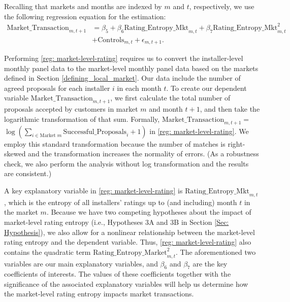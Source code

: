 \documentclass[msom,blindrev]{informs3}
\begin{document}
Recalling that markets and months are indexed by $m$ and $t$, respectively, we use the following regression equation for the estimation:
\begin{align} \nonumber
   \text{Market\_Transaction}_{m,t+1} & =\beta_{5} + \beta_{6} \text{Rating\_Entropy\_Mkt}_{m,t}+ \beta_{7} \text{Rating\_Entropy\_Mkt}_{m,t}^2\\ \label{reg: market-level-rating}
   &+ \text{Controls}_{m,t}  +\epsilon_{m,t+1}.
\end{align}

Performing \eqref{reg: market-level-rating} requires us to convert the installer-level monthly panel data to the market-level monthly panel data based on the markets defined in Section \ref{defining_local_market}. Our data include the number of agreed proposals for each installer $i$ in each month $t$. To create our dependent variable $\text{Market\_Transaction}_{m,t+1}$, we first calculate the total number of proposals accepted by customers in market $m$ and month $t+1$, and then take the logarithmic transformation of that sum. Formally, $\text{Market\_Transaction}_{m,t+1} =$ $\log\left( \sum_{i \in \text{Market\ } m} \text{Successful\_Proposals}_{i}+ 1 \right)$ in \eqref{reg: market-level-rating}.  We employ this standard transformation because the number of matches is right-skewed and the transformation increases the normality of errors. (As a robustness check, we also perform the analysis without log transformation and the results are consistent.)

A key explanatory variable in \eqref{reg: market-level-rating} is $\text{Rating\_Entropy\_Mkt}_{m,t}$, which is the entropy of all installers' ratings up to (and including) month $t$ in the market $m$.
 Because we have two competing hypotheses about the impact of market-level rating entropy (i.e., Hypotheses 3A and 3B in Section \ref{Sec: Hypothesis}), we also allow for a  nonlinear relationship between the market-level rating entropy and the dependent variable. Thus, \eqref{reg: market-level-rating} also contains the quadratic term  $\text{Rating\_Entropy\_Market}_{m,t}^{2}$. The aforementioned two variables are our main explanatory variables, and $\beta_{6}$ and $\beta_{7}$ are the key coefficients of interests. The values of these coefficients together with the significance of the associated explanatory variables will help us determine how the market-level rating entropy impacts market transactions.
\end{document}
